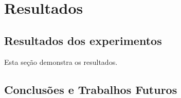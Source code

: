 \pagestyle{empty}
\cleardoublepage
\pagestyle{fancy}

\chapter{Resultados}\label{cap6}

\section{Resultados dos experimentos}\label{cap6:intro}

Esta seção demonstra os resultados.


\section{Conclusões e Trabalhos Futuros}\label{cap6:conclusao}




